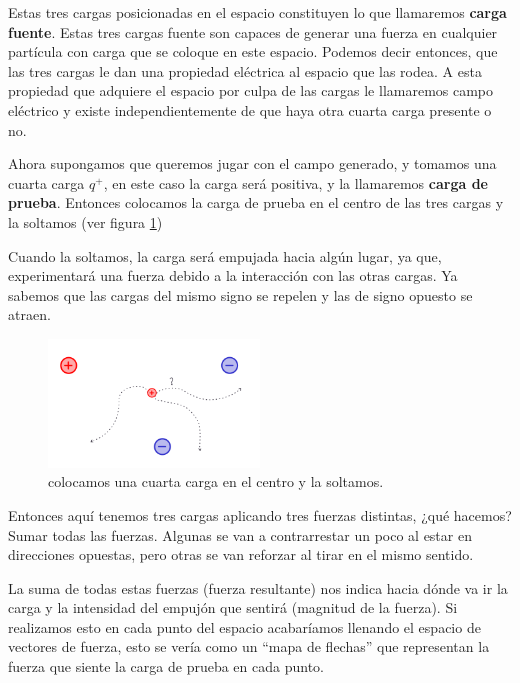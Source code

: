 Estas tres cargas posicionadas en el espacio constituyen lo que llamaremos \textbf{carga fuente}. Estas tres cargas fuente son capaces de generar una fuerza en cualquier partícula con carga que se coloque en este espacio. Podemos decir entonces, que las tres cargas le dan una propiedad eléctrica al espacio que las rodea. A esta propiedad que adquiere el espacio por culpa de las cargas le llamaremos campo eléctrico y existe independientemente de que haya otra cuarta carga presente o no.

Ahora supongamos que queremos jugar con el campo generado, y tomamos una cuarta carga \( q^{+} \), en este caso la carga será positiva, y la llamaremos \textbf{carga de prueba}. Entonces colocamos la carga de prueba en el centro de las tres cargas y la soltamos (ver figura \ref{fig:campo_electrico_ejemplo_2})

Cuando la soltamos, la carga será empujada hacia algún lugar, ya que, experimentará una fuerza debido a la interacción con las otras cargas. Ya sabemos que las cargas del mismo signo se repelen y las de signo opuesto se atraen.

\begin{figure}[ht]
    \centering
    \includegraphics[width=0.5\textwidth]{images/field_ex_2.png}
    \caption{colocamos una cuarta carga en el centro y la soltamos.}
    \label{fig:campo_electrico_ejemplo_2}
\end{figure}

Entonces aquí tenemos tres cargas aplicando tres fuerzas distintas, ¿qué hacemos? Sumar todas las fuerzas. Algunas se van a contrarrestar un poco al estar en direcciones opuestas, pero otras se van reforzar al tirar en el mismo sentido.

La suma de todas estas fuerzas (fuerza resultante) nos indica hacia dónde va ir la carga y la intensidad del empujón que sentirá (magnitud de la fuerza). Si realizamos esto en cada punto del espacio acabaríamos llenando el espacio de vectores de fuerza, esto se vería como un ``mapa de flechas'' que representan la fuerza que siente la carga de prueba en cada punto.

